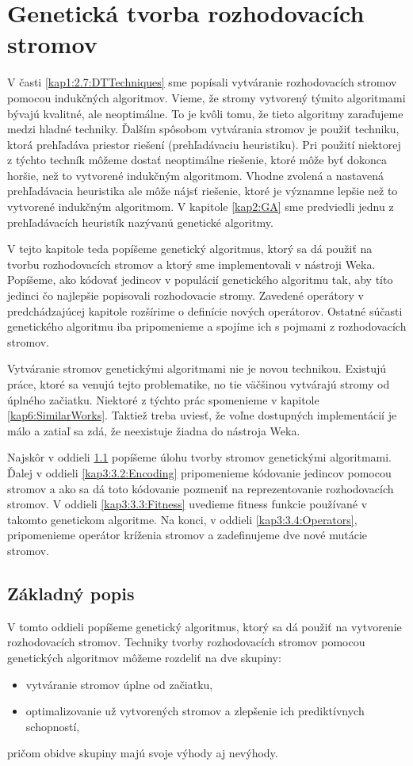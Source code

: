 \chapter{Genetická tvorba rozhodovacích stromov}\label{kap3:GA}
V časti \ref{kap1:2.7:DTTechniques} sme popísali vytváranie rozhodovacích stromov pomocou indukčných algoritmov. Vieme, že stromy vytvorený týmito algoritmami bývajú kvalitné, ale neoptimálne. To je kvôli tomu, že tieto algoritmy zaraďujeme medzi hladné techniky. Ďalším spôsobom vytvárania stromov je použiť techniku, ktorá prehľadáva priestor riešení (prehľadávaciu heuristiku). Pri použití niektorej z týchto techník môžeme dostať neoptimálne riešenie, ktoré môže byť dokonca horšie, než to vytvorené indukčným algoritmom. Vhodne zvolená a nastavená prehľadávacia heuristika ale môže nájsť riešenie, ktoré je významne lepšie než to vytvorené indukčným algoritmom. V kapitole \ref{kap2:GA} sme predviedli jednu z prehľadávacích heuristík nazývanú genetické algoritmy.

V tejto kapitole teda popíšeme genetický algoritmus, ktorý sa dá použiť na tvorbu rozhodovacích stromov a ktorý sme implementovali v nástroji Weka. Popíšeme, ako kódovať jedincov v populácií genetického algoritmu tak, aby títo jedinci čo najlepšie popisovali rozhodovacie stromy. Zavedené operátory v predchádzajúcej kapitole rozšírime o definície nových operátorov. Ostatné súčasti genetického algoritmu iba pripomenieme a spojíme ich s pojmami z rozhodovacích stromov.

Vytváranie stromov genetickými algoritmami nie je novou technikou. Existujú práce, ktoré sa venujú tejto problematike, no tie väčšinou vytvárajú stromy od úplného začiatku. Niektoré z týchto prác spomenieme v kapitole \ref{kap6:SimilarWorks}. Taktiež treba uviesť, že voľne dostupných implementácií je málo a zatiaľ sa zdá, že neexistuje žiadna do nástroja Weka.

Najskôr v oddieli \ref{kap3:3.1:Intro} popíšeme úlohu tvorby stromov genetickými algoritmami. Ďalej v oddieli \ref{kap3:3.2:Encoding} pripomenieme kódovanie jedincov pomocou stromov a ako sa dá toto kódovanie pozmeniť na reprezentovanie rozhodovacích stromov. V oddieli \ref{kap3:3.3:Fitness} uvedieme fitness funkcie používané v takomto genetickom algoritme. Na konci, v oddieli \ref{kap3:3.4:Operators}, pripomenieme operátor kríženia stromov a zadefinujeme dve nové mutácie stromov.
\section{Základný popis}\label{kap3:3.1:Intro}
V tomto oddieli popíšeme genetický algoritmus, ktorý sa dá použiť na vytvorenie rozhodovacích stromov. Techniky tvorby rozhodovacích stromov pomocou genetických algoritmov môžeme rozdeliť na dve skupiny:
\begin{itemize}
\item vytváranie stromov úplne od začiatku,
\item optimalizovanie už vytvorených stromov a zlepšenie ich prediktívnych schopností,
\end{itemize}
pričom obidve skupiny majú svoje výhody aj nevýhody.

